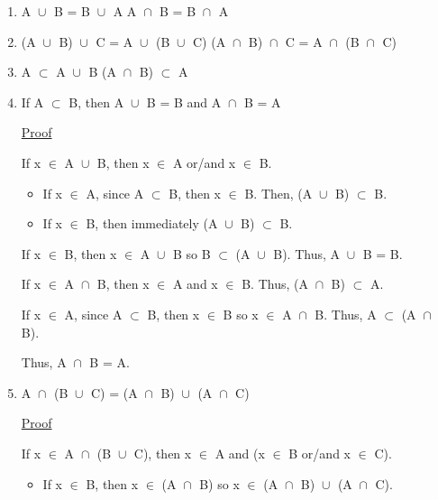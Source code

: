 	\begin{enumerate}[label=(\alph*), leftmargin=2cm, itemsep=0.1cm]
		\item A $\cup_{}^{}$ B = B $\cup_{}^{}$ A
			\hspace{4cm} A $\cap_{}^{}$ B = B $\cap_{}^{}$ A

		\item (A $\cup_{}^{}$ B) $\cup_{}^{}$ C = A $\cup_{}^{}$ (B $\cup_{}^{}$ C)
			\hspace{1.6cm} (A $\cap_{}^{}$ B) $\cap_{}^{}$ C = A $\cap_{}^{}$ (B $\cap_{}^{}$ C)

		\item A $\subset$ A $\cup_{}^{}$ B
			\hspace{4.8cm} (A $\cap_{}^{}$ B) $\subset$ A

		\item If A $\subset$ B, then A $\cup_{}^{}$ B = B and A $\cap_{}^{}$ B = A

			{ \color{magenta} \underline{Proof} } 
			
				If x $\in$ A $\cup_{}^{}$ B, then x $\in$ A or/and x $\in$ B.
				\begin{itemize}[leftmargin=1cm, itemsep=0.2cm]
					\item If x $\in$ A, since A $\subset$ B, then x $\in$ B.
						Then, (A $\cup_{}^{}$ B) $\subset$ B.

					\item If x $\in$ B, then immediately (A $\cup_{}^{}$ B) $\subset$ B.
				\end{itemize}
				If x $\in$ B, then x $\in$ A $\cup_{}^{}$ B so B $\subset$ (A $\cup_{}^{}$ B).
				Thus, A $\cup_{}^{}$ B = B.

				\vspace{0.5cm}

				If x $\in$ A $\cap_{}^{}$ B, then x $\in$ A and x $\in$ B.
				Thus, (A $\cap_{}^{}$ B) $\subset$ A.

				If x $\in$ A, since A $\subset$ B, then x $\in$ B so x $\in$ A $\cap_{}^{}$ B.
				Thus, A $\subset$ (A $\cap_{}^{}$ B).

				Thus, A $\cap_{}^{}$ B = A.

		\item A $\cap_{}^{}$ (B $\cup_{}^{}$ C) = (A $\cap_{}^{}$ B) $\cup_{}^{}$ (A $\cap_{}^{}$ C)

			{ \color{magenta} \underline{Proof} } 
			
				If x $\in$ A $\cap_{}^{}$ (B $\cup_{}^{}$ C), then x $\in$ A
				and (x $\in$ B or/and x $\in$ C).
				\begin{itemize}[leftmargin=1cm, itemsep=0.1cm]
					\item If x $\in$ B, then x $\in$ (A $\cap_{}^{}$ B) so
						x $\in$ (A $\cap_{}^{}$ B) $\cup_{}^{}$ (A $\cap_{}^{}$ C).


\end{itemize}
\end{enumerate}
